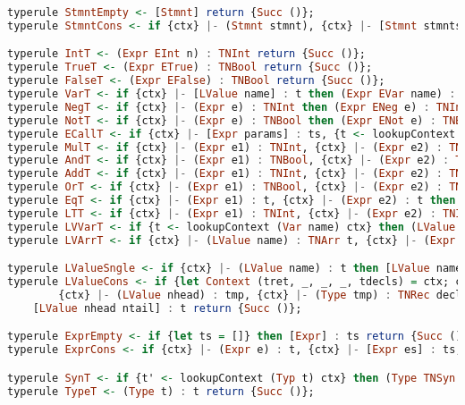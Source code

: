 \begin{lstlisting}[language=Haskell]
typerule StmntEmpty <- [Stmnt] return {Succ ()};
typerule StmntCons <- if {ctx} |- (Stmnt stmnt), {ctx} |- [Stmnt stmnts] then [Stmnt stmnt stmnts] return {Succ ()};

typerule IntT <- (Expr EInt n) : TNInt return {Succ ()};
typerule TrueT <- (Expr ETrue) : TNBool return {Succ ()};
typerule FalseT <- (Expr EFalse) : TNBool return {Succ ()};
typerule VarT <- if {ctx} |- [LValue name] : t then (Expr EVar name) : t return {Succ ()};
typerule NegT <- if {ctx} |- (Expr e) : TNInt then (Expr ENeg e) : TNInt return {Succ ()};
typerule NotT <- if {ctx} |- (Expr e) : TNBool then (Expr ENot e) : TNBool return {Succ ()};
typerule ECallT <- if {ctx} |- [Expr params] : ts, {t <- lookupContext (Func name ts) ctx} then (Expr ECall name params) : t return {Succ ()};
typerule MulT <- if {ctx} |- (Expr e1) : TNInt, {ctx} |- (Expr e2) : TNInt then (Expr EMul e1 e2) : TNInt return {Succ ()};
typerule AndT <- if {ctx} |- (Expr e1) : TNBool, {ctx} |- (Expr e2) : TNBool then (Expr EAnd e1 e2) : TNBool return {Succ ()};
typerule AddT <- if {ctx} |- (Expr e1) : TNInt, {ctx} |- (Expr e2) : TNInt then (Expr EAdd e1 e2) : TNInt return {Succ ()};
typerule OrT <- if {ctx} |- (Expr e1) : TNBool, {ctx} |- (Expr e2) : TNBool then (Expr EOr e1 e2) : TNBool return {Succ ()};
typerule EqT <- if {ctx} |- (Expr e1) : t, {ctx} |- (Expr e2) : t then (Expr EEq e1 e2) : TNBool return {Succ ()};
typerule LTT <- if {ctx} |- (Expr e1) : TNInt, {ctx} |- (Expr e2) : TNInt then (Expr ELT e1 e2) : TNBool return {Succ ()};
typerule LVVarT <- if {t <- lookupContext (Var name) ctx} then (LValue LVVar name) : t return {Succ ()};
typerule LVArrT <- if {ctx} |- (LValue name) : TNArr t, {ctx} |- (Expr e) : TNInt then (LValue LVArr name e) : t return {Succ ()};

typerule LValueSngle <- if {ctx} |- (LValue name) : t then [LValue name] : t return {Succ ()};
typerule LValueCons <- if {let Context (tret, _, _, _, tdecls) = ctx; ctx' = Context (tret, emptyContext, emptyContext, emptyContext, tdecls)}, 
        {ctx} |- (LValue nhead) : tmp, {ctx} |- (Type tmp) : TNRec decls, {ctx'} |- [VarDecl decls], {var1} |- [LValue ntail] : t then 
    [LValue nhead ntail] : t return {Succ ()};

typerule ExprEmpty <- if {let ts = []} then [Expr] : ts return {Succ ()};
typerule ExprCons <- if {ctx} |- (Expr e) : t, {ctx} |- [Expr es] : ts, {let ts' = t : ts} then [Expr e es] : ts' return {Succ ()};

typerule SynT <- if {t' <- lookupContext (Typ t) ctx} then (Type TNSyn t) : t' return {Succ ()};
typerule TypeT <- (Type t) : t return {Succ ()};
\end{lstlisting}

